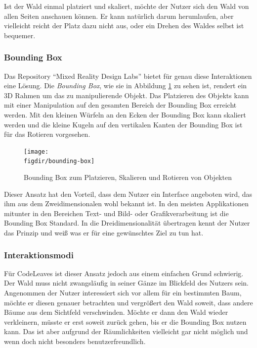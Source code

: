 Ist der Wald einmal platziert und skaliert, möchte der Nutzer sich den Wald von allen Seiten anschauen können. Er kann natürlich darum herumlaufen, aber vielleicht reicht der Platz dazu nicht aus, oder ein Drehen des Waldes selbst ist bequemer.

\subsubsection*{Bounding Box}

Das Repository "`Mixed Reality Design Labs"' bietet für genau diese Interaktionen eine Lösung. Die \textit{Bounding Box}, wie sie in Abbildung \ref{fig:bounding-box} zu sehen ist, rendert ein 3D Rahmen um das zu manipulierende Objekt. Das Platzieren des Objekts kann mit einer Manipulation auf den gesamten Bereich der Bounding Box erreicht werden. Mit den kleinen Würfeln an den Ecken der Bounding Box kann skaliert werden und die kleine Kugeln auf den vertikalen Kanten der Bounding Box ist für das Rotieren vorgesehen.

\begin{figure}[htb]
  \texttt{[image: \\figdir/bounding-box]}
  \caption{Bounding Box zum Platzieren, Skalieren und Rotieren von Objekten \cite{microsoft2017mixed}}
  \label{fig:bounding-box}
\end{figure}

Dieser Ansatz hat den Vorteil, dass dem Nutzer ein Interface angeboten wird, das ihm aus dem Zweidimensionalen wohl bekannt ist. In den meisten Applikationen mitunter in den Bereichen Text- und Bild- oder Grafikverarbeitung ist die Bounding Box Standard. In die Dreidimensionalität übertragen kennt der Nutzer das Prinzip und weiß was er für eine gewünschtes Ziel zu tun hat.

\subsubsection*{Interaktionsmodi}

Für CodeLeaves ist dieser Ansatz jedoch aus einem einfachen Grund schwierig. Der Wald muss nicht zwangsläufig in seiner Gänze im Blickfeld des Nutzers sein. Angenommen der Nutzer interessiert sich vor allem für ein bestimmten Baum, möchte er diesen genauer betrachten und vergrößert den Wald soweit, dass andere Bäume aus dem Sichtfeld verschwinden. Möchte er dann den Wald wieder verkleinern, müsste er erst soweit zurück gehen, bis er die Bounding Box nutzen kann. Das ist aber aufgrund der Räumlichkeiten vielleicht gar nicht möglich und wenn doch nicht besonders benutzerfreundlich.


